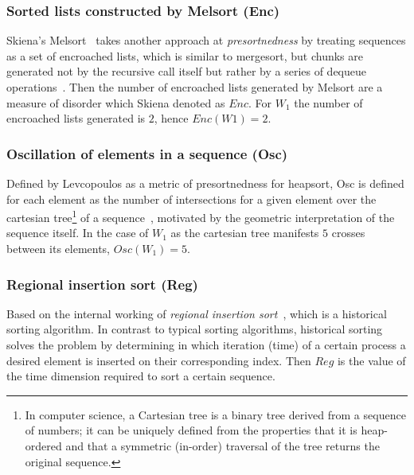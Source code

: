 \subsubsection{Sorted lists constructed by Melsort (Enc)}
Skiena's Melsort~\cite{Skiena_1988} takes another approach at \textit{presortnedness} by treating sequences as a set of encroached lists, which is similar to mergesort, but chunks are generated not by the recursive call itself but rather by a series of dequeue operations~\cite{Baeza-Yates_Manber_1992}. Then the number of encroached lists generated by Melsort are a measure of disorder which Skiena denoted as $Enc$. For $W_1$ the number of encroached lists generated is $2$, hence $Enc(W1)=2$.\\

\subsubsection{Oscillation of elements in a sequence (Osc)}
Defined by Levcopoulos as a metric of presortnedness for heapsort, Osc is defined for each element as the number of intersections for a given element over the cartesian tree\footnote{In computer science, a Cartesian tree is a binary tree derived from a sequence of numbers; it can be uniquely defined from the properties that it is heap-ordered and that a symmetric (in-order) traversal of the tree returns the original sequence.} of a sequence~\cite{Levcopoulos_Petersson_1993}, motivated by the geometric interpretation of the sequence itself. In the case of $W_1$ as the cartesian tree manifests $5$ crosses between its  elements, $Osc(W_1) = 5$.\\

\subsubsection{Regional insertion sort (Reg)}
Based on the internal working of \textit{regional insertion sort}~\cite{PETERSSON1995153}, which is a historical sorting algorithm. In contrast to typical sorting algorithms, historical sorting solves the problem by determining in which iteration (time) of a certain process a desired element is inserted on their corresponding index. Then $Reg$ is the value of the time dimension required to sort a certain sequence. 
